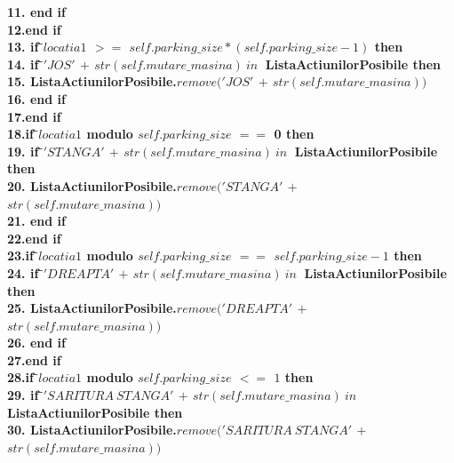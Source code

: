 \documentclass{article}
\begin{document}
\begin{center}
\begin{tabbing}
\bfseries{11.}\indent\>        \>\textbf{end if}\\
\bfseries{12.}\indent\>\textbf{end if}\\
\bfseries{13.}\indent\> \textbf{if } \=$locatia1$ $>=$ $self.parking\_size*(self.parking\_size-1)$ \textbf{ then}\\
\bfseries{14.}\indent\>       \>\textbf{if } \=$'JOS'$ $+$ $str(self.mutare\_masina) \ in \ $ \textbf{ListaActiunilorPosibile} \textbf{ then} \\
\bfseries{15.}\indent          \> \> \>\textbf{ListaActiunilorPosibile}.$remove('JOS'$ $+$ $str(self.mutare\_masina))$\\
\bfseries{16.}\indent\>        \>\textbf{end if}\\
\bfseries{17.}\indent\>\textbf{end if}\\
\bfseries{18.}\indent\>\textbf{if } \=$locatia1$ \textbf{ modulo } $self.parking\_size$ $==$ 0 \textbf{ then}\\
\bfseries{19.}\indent\>       \>\textbf{if } \=$'STANGA'$ $+$ $str(self.mutare\_masina) \ in \ $ \textbf{ListaActiunilorPosibile} \textbf{ then} \\
\bfseries{20.}\indent          \> \> \>\textbf{ListaActiunilorPosibile}.$remove('STANGA'$ $+$ $str(self.mutare\_masina))$\\
\bfseries{21.}\indent\>        \>\textbf{end if}\\
\bfseries{22.}\indent\>\textbf{end if}\\
\bfseries{23.}\indent\>\textbf{if } \=$locatia1$ \textbf{ modulo } $self.parking\_size$ $==$ $self.parking\_size - 1$ \textbf{ then}\\
\bfseries{24.}\indent\>       \>\textbf{if } \=$'DREAPTA'$ $+$ $str(self.mutare\_masina) \ in \ $ \textbf{ListaActiunilorPosibile} \textbf{ then} \\
\bfseries{25.}\indent          \> \> \>\textbf{ListaActiunilorPosibile}.$remove('DREAPTA'$ $+$ $str(self.mutare\_masina))$\\
\bfseries{26.}\indent\>        \>\textbf{end if}\\
\bfseries{27.}\indent\>\textbf{end if}\\
\bfseries{28.}\indent\>\textbf{if } \=$locatia1$ \textbf{ modulo } $self.parking\_size$ $<=$ $1$ \textbf{ then}\\
\bfseries{29.}\indent\>       \>\textbf{if } \=$'SARITURA\ STANGA'$ $+$ $str(self.mutare\_masina) \ in \ $ \textbf{ListaActiunilorPosibile} \textbf{ then} \\
\bfseries{30.}\indent          \> \> \>\textbf{ListaActiunilorPosibile}.$remove('SARITURA\ STANGA'$ $+$ $str(self.mutare\_masina))$\\

\end{tabbing}
\end{center}
\end{document}
